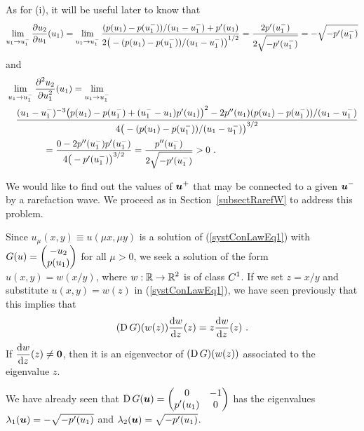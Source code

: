 \begin{egg}
As for (i), it will be useful later to know that
\[
\lim_{u_1 \to u^-_1} \frac{\partial{u_2}}{\partial u_1}(u_1) =
\lim_{u_1 \to u^-_1} \frac{(p(u_1) - p(u^-_1))/(u_1-u^-_1) + p'(u_1)}
{2\big( -(p(u_1) - p(u^-_1))/(u_1-u^-_1) \big)^{1/2}} 
= \frac{2p'(u^-_1)}{2\sqrt{-p'(u^-_1)}} = -\sqrt{-p'(u^-_1)}
\]
and
\begin{align*}
&\lim_{u_1 \to u^-_1} \frac{\displaystyle \partial^{2}{u_2}} {\displaystyle \partial u_1^{2}}(u_1)
=\lim_{u_1 \to u^-_1} \\
&\quad \frac{(u_1 -u^-_1)^{-3}\big(p(u_1) - p(u^-_1) +(u^-_1-u_1) p'(u_1)\big)^2
- 2 p''(u_1) (p(u_1)-p(u^-_1))/(u_1-u^-_1)}
{4\big(-(p(u_1) - p(u^-_1))/(u_1 - u^-_1)\big)^{3/2}} \\
&\qquad \qquad = \frac{0  - 2 p''(u^-_1) p'(u^-_1)}{4 \big(-p'(u^-_1)\big)^{3/2}}
= \frac{p''(u^-_1)}{2 \sqrt{-p'(u^-_1)}} > 0 \ .
\end{align*}

  We would like to find out the values
of $\displaystyle {\bm{u}}^+$ that may be connected to a given
$\displaystyle {\bm{u}}^-$ by a
rarefaction wave.  We proceed as in Section~\ref{subsectRarefW} to
address this problem.

Since $u_\mu(x,y) \equiv u(\mu x, \mu y)$ is a solution of
(\ref{systConLawEq1}) with
$\displaystyle G(u) = \begin{pmatrix} -u_2 \\ p(u_1) \end{pmatrix}$
for all $\mu >0$, we seek a solution of the form $u(x,y) = w(x/y)$, where
$\displaystyle w:\mathbb{R} \to \mathbb{R}^2$ is of class $\displaystyle C^1$.  If we
set $z = x/y$ and substitute $u(x,y) = w(z)$ in (\ref{systConLawEq1}),
we have seen previously that this implies that
\[
(\operatorname{D} G)(w(z)) \frac{\mathrm{d}w}{\mathrm{d}{z}}(z) = z \frac{\mathrm{d}w}{\mathrm{d}{z}}(z) \ .
\]
If $\displaystyle \frac{\mathrm{d}w}{\mathrm{d}{z}}(z) \neq {\bm{0}}$, then it is an
eigenvector of $(\operatorname{D} G)(w(z))$ associated to the eigenvalue $z$.

We have already seen that
$\displaystyle \operatorname{D} G({\bm{u}}) = \begin{pmatrix} 0 & -1 \\
p'(u_1) & 0 \end{pmatrix}$ has the eigenvalues\\
$\lambda_1({\bm{u}}) = -\sqrt{-p'(u_1)}$ and
$\lambda_2({\bm{u}}) = \sqrt{-p'(u_1)}$.


\end{egg}

